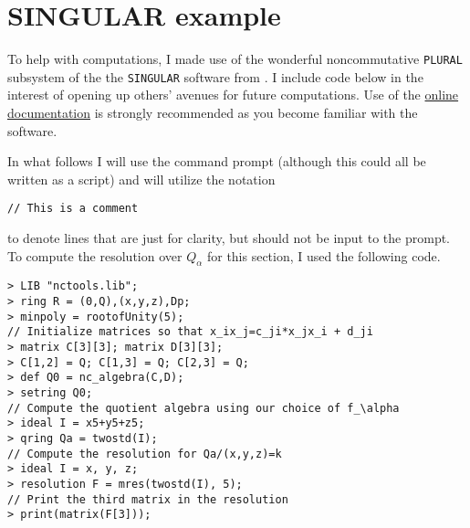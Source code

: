 \documentclass [11pt, proquest] {uwthesis}[2020/02/24]
\begin{document}
\section{SINGULAR example}\label{code:singular-resolution}
To help with computations, I made use of the wonderful noncommutative \texttt{PLURAL} subsystem of the the \texttt{SINGULAR} software from \cite{singular}. I include code below in the interest of opening up others' avenues for future computations. Use of the \href{https://www.singular.uni-kl.de/index.php/singular-manual.html}{online documentation} is strongly recommended as you become familiar with the software.

In what follows I will use the command prompt (although this could all be written as a script) and will utilize the notation
\begin{verbatim}
// This is a comment
\end{verbatim}
to denote lines that are just for clarity, but should not be input to the prompt.
To compute the resolution over $Q_\alpha$ for this section, I used the following code. 
\begin{verbatim}
> LIB "nctools.lib";
> ring R = (0,Q),(x,y,z),Dp;
> minpoly = rootofUnity(5);
// Initialize matrices so that x_ix_j=c_ji*x_jx_i + d_ji
> matrix C[3][3]; matrix D[3][3];
> C[1,2] = Q; C[1,3] = Q; C[2,3] = Q;
> def Q0 = nc_algebra(C,D);
> setring Q0;
// Compute the quotient algebra using our choice of f_\alpha
> ideal I = x5+y5+z5;
> qring Qa = twostd(I);
// Compute the resolution for Qa/(x,y,z)=k
> ideal I = x, y, z;
> resolution F = mres(twostd(I), 5);
// Print the third matrix in the resolution
> print(matrix(F[3]));
\end{verbatim}
\end{document}
